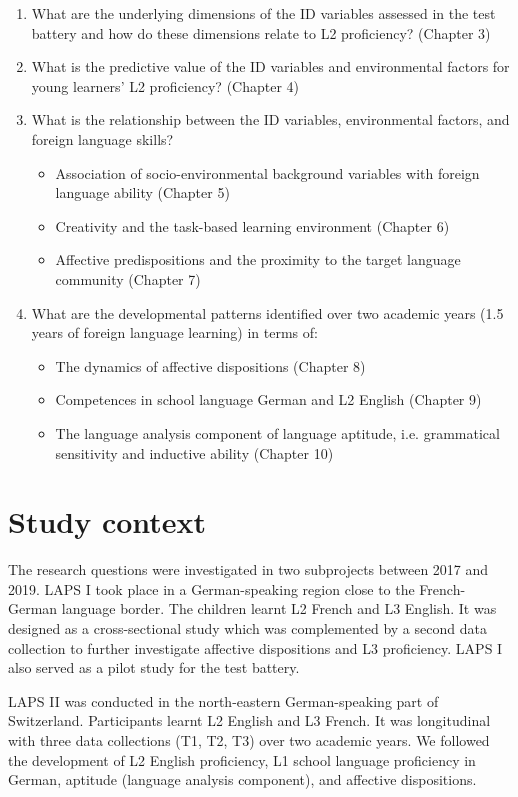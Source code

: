 \documentclass[output=paper]{langsci/langscibook}
\begin{document}
\begin{enumerate}
\item What are the underlying dimensions of the ID variables assessed in the test battery and how do these dimensions relate to L2 proficiency? (Chapter 3)
\item What is the predictive value of the ID variables and environmental factors for young learners’ L2 proficiency? (Chapter 4)
\item What is the relationship between the ID variables, environmental factors, and foreign language skills?
    \begin{itemize}
    \item Association of socio-environmental background variables with foreign language ability (Chapter 5)
    \item Creativity and the task-based learning environment (Chapter 6)
    \item Affective predispositions and the proximity to the target language community (Chapter 7)
    \end{itemize}
\item What are the developmental patterns identified over two academic years (1.5 years of foreign language learning) in terms of:
    \begin{itemize}
    \item The dynamics of affective dispositions (Chapter 8)
    \item Competences in school language German and L2 English (Chapter 9)
    \item The language analysis component of language aptitude, i.e. grammatical sensitivity and inductive ability (Chapter 10)
    \end{itemize}
\end{enumerate}

\section{Study context}\label{sec:02:2}

The research questions were investigated in two subprojects between 2017 and 2019.  LAPS I took place in a German-speaking region close to the French-German language border. The children learnt L2 French and L3 English. It was designed as a cross-sectional study which was complemented by a second data collection to further investigate affective dispositions and L3 proficiency.  LAPS I also served as a pilot study for the test battery. 

LAPS II was conducted in the north-eastern German-speaking part of Switzerland. Participants learnt L2 English and L3 French. It was longitudinal with three data collections (T1, T2, T3) over two academic years. We followed the development of L2 English proficiency, L1 school language proficiency in German, aptitude (language analysis component), and affective dispositions. 
\end{document}
